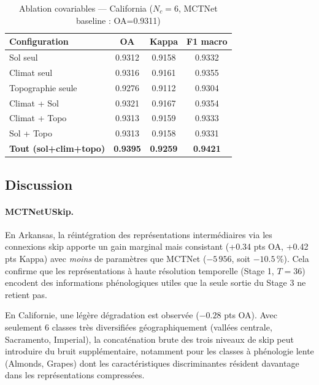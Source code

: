 \begin{table}[H]
\centering
\caption{Ablation covariables — California ($N_c=6$, MCTNet baseline : OA=0.9311)}
\label{tab:ablation_california}
\begin{tabular}{lccc}
\toprule
\textbf{Configuration} & \textbf{OA} & \textbf{Kappa} & \textbf{F1 macro} \\
\midrule
Sol seul             & 0.9312 & 0.9158 & 0.9332 \\
Climat seul          & 0.9316 & 0.9161 & 0.9355 \\
Topographie seule    & 0.9276 & 0.9112 & 0.9304 \\
Climat + Sol         & 0.9321 & 0.9167 & 0.9354 \\
Climat + Topo        & 0.9313 & 0.9159 & 0.9333 \\
Sol + Topo           & 0.9313 & 0.9158 & 0.9331 \\
\textbf{Tout (sol+clim+topo)} & \textbf{0.9395} & \textbf{0.9259} & \textbf{0.9421} \\
\bottomrule
\end{tabular}
\end{table}

\subsection{Discussion}

\paragraph{MCTNetUSkip.}
En Arkansas, la réintégration des représentations intermédiaires via les
connexions skip apporte un gain marginal mais consistant (+0.34 pts OA,
+0.42 pts Kappa) avec \emph{moins} de paramètres que MCTNet ($-5\,956$,
soit $-10.5$\,\%). Cela confirme que les représentations à haute résolution
temporelle (Stage 1, $T=36$) encodent des informations phénologiques utiles
que la seule sortie du Stage 3 ne retient pas.

En Californie, une légère dégradation est observée ($-0.28$ pts OA). Avec
seulement 6 classes très diversifiées géographiquement (vallées centrale,
Sacramento, Imperial), la concaténation brute des trois niveaux de skip peut
introduire du bruit supplémentaire, notamment pour les classes à phénologie
lente (Almonds, Grapes) dont les caractéristiques discriminantes résident
davantage dans les représentations compressées.

